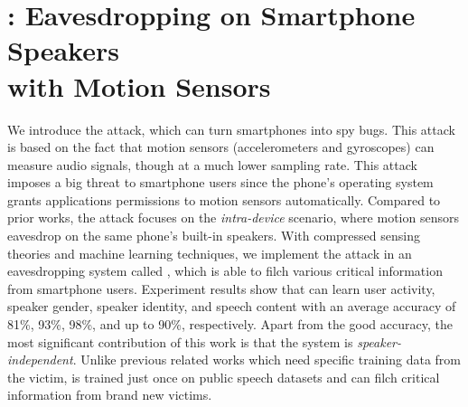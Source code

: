 \chapter{{\spp}: Eavesdropping on Smartphone Speakers\protect \\ with Motion Sensors}

We introduce the \textit{{\attackName}} attack, which can turn smartphones into spy bugs. This attack is based on the fact that motion sensors (accelerometers and gyroscopes) can measure audio signals, though at a much lower sampling rate. This attack imposes a big threat to smartphone users since the phone's operating system grants applications permissions to motion sensors automatically. Compared to prior works, the {\attackName} attack focuses on the \textit{intra-device} scenario, where motion sensors eavesdrop on the same phone's built-in speakers. With compressed sensing theories and machine learning techniques, we implement the attack in an eavesdropping system called {\textit{\systemName}}, which is able to filch various critical information from smartphone users. Experiment results show that {\systemName} can learn user activity, speaker gender, speaker identity, and speech content with an average accuracy of 81\%, 93\%, 98\%, and up to 90\%, respectively. Apart from the good accuracy, the most significant contribution of this work is that the {\systemName} system is \textit{speaker-independent}. Unlike previous related works which need specific training data from the victim, {\systemName} is trained just once on public speech datasets and can filch critical information from brand new victims.

%

%

%
	
%
	
%

%

%

%

